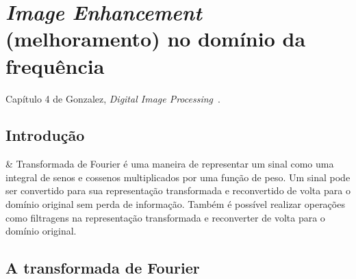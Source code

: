 \chapter{\emph{Image Enhancement} (melhoramento) no domínio da frequência}

Capítulo 4 de Gonzalez, \textit{Digital Image Processing}~\cite{gonzalez2006image}.

\section{Introdução}

\begin{easylist}

  & Transformada de Fourier é uma maneira de representar um sinal como uma integral de senos e cossenos multiplicados por uma função de peso. Um sinal pode ser convertido para sua representação transformada e reconvertido de volta para o domínio original sem perda de informação. Também é possível realizar operações como filtragens na representação transformada e reconverter de volta para o domínio original.

\end{easylist}
  
\section{A transformada de Fourier}

